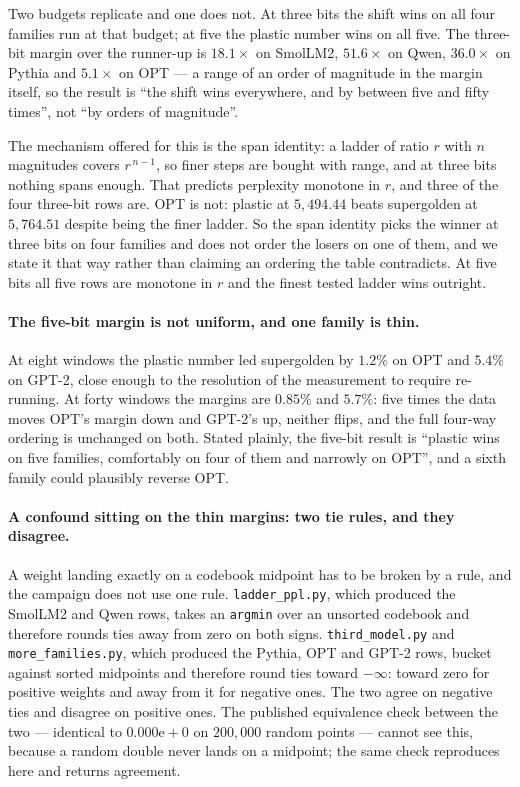 \documentclass[11pt]{article}
\theoremstyle{definition}
\begin{document}
Two budgets replicate and one does not. At three bits the shift wins on all four
families run at that budget; at five the plastic number wins on all five. The
three-bit margin over the runner-up is $18.1\times$ on SmolLM2, $51.6\times$ on
Qwen, $36.0\times$ on Pythia and $5.1\times$ on OPT --- a range of an order of
magnitude in the margin itself, so the result is ``the shift wins everywhere,
and by between five and fifty times'', not ``by orders of magnitude''.

The mechanism offered for this is the span identity: a ladder of ratio $r$ with
$n$ magnitudes covers $r^{\,n-1}$, so finer steps are bought with range, and at
three bits nothing spans enough. That predicts perplexity monotone in $r$, and
three of the four three-bit rows are. OPT is not: plastic at $5{,}494.44$ beats
supergolden at $5{,}764.51$ despite being the finer ladder. So the span identity
picks the winner at three bits on four families and does not order the losers on
one of them, and we state it that way rather than claiming an ordering the table
contradicts. At five bits all five rows are monotone in $r$ and the finest
tested ladder wins outright.

\paragraph{The five-bit margin is not uniform, and one family is thin.} At eight
windows the plastic number led supergolden by $1.2\%$ on OPT and $5.4\%$ on
GPT-2, close enough to the resolution of the measurement to require re-running.
At forty windows the margins are $0.85\%$ and $5.7\%$: five times the data moves
OPT's margin down and GPT-2's up, neither flips, and the full four-way ordering
is unchanged on both. Stated plainly, the five-bit result is ``plastic wins on
five families, comfortably on four of them and narrowly on OPT'', and a sixth
family could plausibly reverse OPT.

\paragraph{A confound sitting on the thin margins: two tie rules, and they
disagree.} A weight landing exactly on a codebook midpoint has to be broken by a
rule, and the campaign does not use one rule. \texttt{ladder\_ppl.py}, which
produced the SmolLM2 and Qwen rows, takes an \texttt{argmin} over an unsorted
codebook and therefore rounds ties away from zero on both signs.
\texttt{third\_model.py} and \texttt{more\_families.py}, which produced the
Pythia, OPT and GPT-2 rows, bucket against sorted midpoints and therefore round
ties toward $-\infty$: toward zero for positive weights and away from it for
negative ones. The two agree on negative ties and disagree on positive ones. The
published equivalence check between the two --- identical to $0.000\mathrm{e}{+}0$
on $200{,}000$ random points --- cannot see this, because a random double never
lands on a midpoint; the same check reproduces here and returns agreement.
\end{document}
